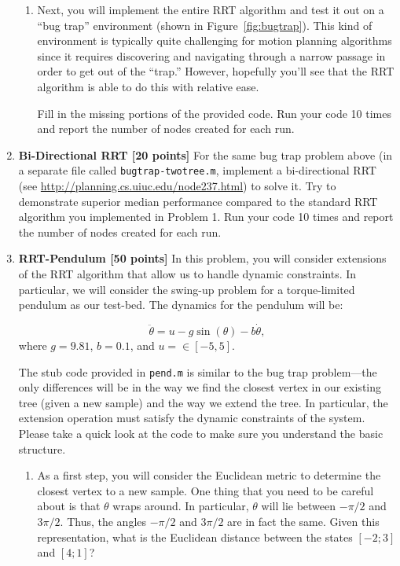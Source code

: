 \documentclass[11pt,letterpaper]{article}
\begin{document}
\begin{enumerate}
\begin{enumerate}
\item Next, you will implement the entire RRT algorithm and test it out on a ``bug trap'' environment (shown in Figure~\ref{fig:bugtrap}). This kind of environment is typically quite challenging for motion planning algorithms since it requires discovering and navigating through a narrow passage in order to get out of the ``trap.'' However, hopefully you'll see that the RRT algorithm is able to do this with relative ease.


Fill in the missing portions of the provided code. Run your code 10 times and report the number of nodes created for each run. 
\end{enumerate}

\item \textbf{Bi-Directional RRT [20 points]} For the same bug trap problem above (in a separate file called {\tt bugtrap-twotree.m}, implement a bi-directional RRT (see \url{http://planning.cs.uiuc.edu/node237.html}) to solve it. Try to demonstrate superior median performance compared to the standard RRT algorithm you implemented in Problem 1.  Run your code 10 times and report the number of nodes created for each run. 

\item \textbf{RRT-Pendulum [50 points]} In this problem, you will consider extensions of the RRT algorithm that allow us to handle dynamic constraints. In particular, we will consider the swing-up problem for a torque-limited pendulum as our test-bed. The dynamics for the pendulum will be:

\[ \ddot{\theta} = u - g \sin (\theta) -b \dot{\theta}, \]
where $g=9.81$, $b=0.1$, and $u=\in [-5,5]$. 

The stub code provided in {\tt pend.m} is similar to the bug trap problem---the only differences will be in the way we find the closest vertex in our existing tree (given a new sample) and the way we extend the tree. In particular, the extension operation must satisfy the dynamic constraints of the system. Please take a quick look at the code to make sure you understand the basic structure.

\begin{enumerate}

\item  As a first step, you will consider the Euclidean metric to determine the closest vertex to a new sample. One thing that you need to be careful about is that $\theta$ wraps around. In particular, $\theta$ will lie between $-\pi/2$ and $3\pi/2$. Thus,  the angles $-\pi/2$ and $3\pi/2$ are in fact the same. Given this representation, what is the Euclidean distance between the states $[-2;3]$ and $[4;1]$?


\end{enumerate}
\end{enumerate}
\end{document}
